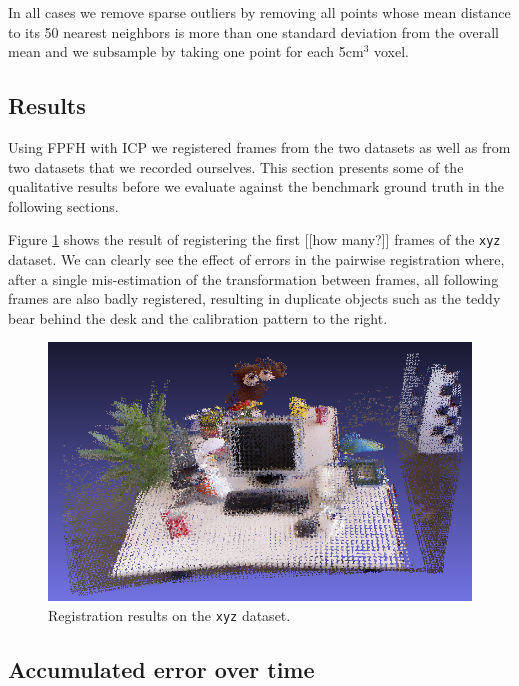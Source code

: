 \documentclass[a4paper]{article}
\begin{document}
 In all cases we remove sparse outliers by removing all points whose mean distance to its 50 nearest neighbors is more than one standard deviation from the overall mean and we subsample by taking one point for each 5cm$^3$ voxel.


\subsection{Results}

Using \ac{FPFH} with \ac{ICP} we registered frames from the two datasets as well as from two datasets that we recorded ourselves. This section presents some of the qualitative results before we evaluate against the benchmark ground truth in the following sections.

Figure \ref{fig:xyz_results} shows the result of registering the first [[how many?]] frames of the \texttt{xyz} dataset. We can clearly see the effect of errors in the pairwise registration where, after a single mis-estimation of the transformation between frames, all following frames are also badly registered, resulting in duplicate objects such as the teddy bear behind the desk and the calibration pattern to the right.

\begin{figure}[htbp]
    \centering
        \includegraphics[width=\textwidth]{ims/xyz_results.png}
    \caption{Registration results on the \texttt{xyz} dataset.}
    \label{fig:xyz_results}
\end{figure}

\subsection{Accumulated error over time}
\label{accumulated_error}
\end{document}
